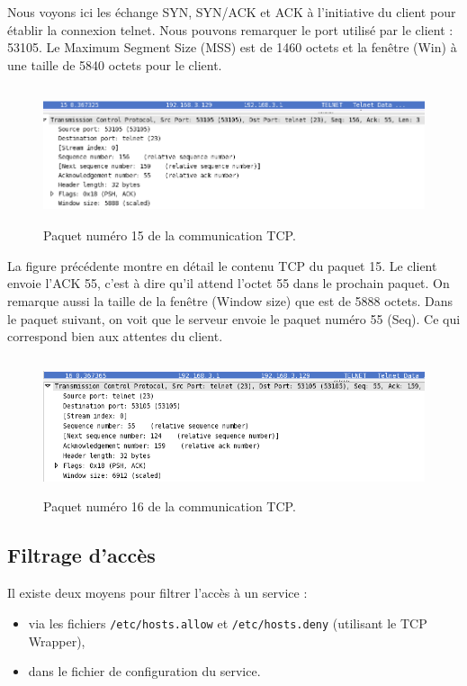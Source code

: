 \documentclass[12pt,a4paper,notitlepage]{article}
\begin{document}
Nous voyons ici les échange SYN, SYN/ACK et ACK à l'initiative du client pour établir la connexion telnet. Nous pouvons remarquer le port utilisé par le client : 53105.  Le Maximum Segment Size (MSS) est de 1460 octets et la fenêtre (Win) à une taille de 5840 octets pour le client.

\begin{figure}[!h]
\begin{center}
\includegraphics[height=4cm]{pck15.png}
\caption{Paquet numéro 15 de la communication TCP.}
\label{fig:do}
\end{center}
\end{figure}

La figure précédente montre en détail le contenu TCP du paquet 15. Le client envoie l'ACK 55, c'est à dire qu'il attend l'octet 55 dans le prochain paquet. On remarque aussi la taille de la fenêtre (\og Window size\fg) que est de 5888 octets. Dans le paquet suivant, on voit que le serveur envoie le paquet numéro 55 (Seq). Ce qui correspond bien aux attentes du client.

\begin{figure}[!h]
\begin{center}
\includegraphics[height=4cm]{pck16.png}
\caption{Paquet numéro 16 de la communication TCP.}
\label{fig:do}
\end{center}
\end{figure}

\subsection{Filtrage d'accès}

Il existe deux moyens pour filtrer l'accès à un service : 
\begin{itemize}
\item via les fichiers \texttt{/etc/hosts.allow} et \texttt{/etc/hosts.deny} (utilisant le TCP Wrapper),
\item dans le fichier de configuration du service.
\end{itemize}
\end{document}
